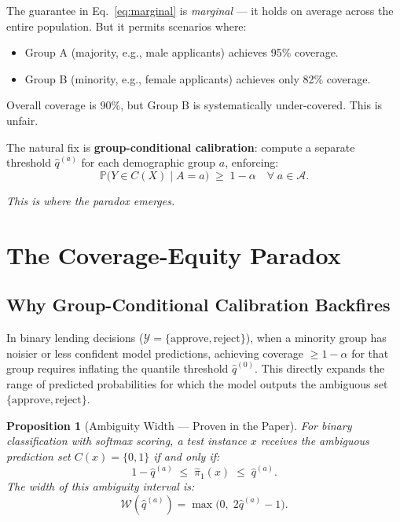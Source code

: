 \documentclass[11pt,a4paper]{article}
\newtheorem{proposition}{Proposition}
\begin{document}
The guarantee in Eq.~\eqref{eq:marginal} is \emph{marginal} --- it holds on average across the entire population. But it permits scenarios where:
\begin{itemize}
    \item Group A (majority, e.g., male applicants) achieves 95\% coverage.
    \item Group B (minority, e.g., female applicants) achieves only 82\% coverage.
\end{itemize}
Overall coverage is 90\%, but Group B is systematically under-covered. This is unfair.

The natural fix is \textbf{group-conditional calibration}: compute a separate threshold $\hat{q}^{(a)}$ for each demographic group $a$, enforcing:
\begin{equation}
\label{eq:group_cond}
\mathbb{P}\bigl(Y \in C(X) \mid A = a\bigr) \;\ge\; 1 - \alpha \quad \forall\; a \in \mathcal{A}.
\end{equation}

\emph{This is where the paradox emerges.}

\section{The Coverage-Equity Paradox}
\label{sec:paradox}

\subsection{Why Group-Conditional Calibration Backfires}

In binary lending decisions ($\mathcal{Y} = \{\text{approve}, \text{reject}\}$), when a minority group has noisier or less confident model predictions, achieving coverage $\ge 1-\alpha$ for that group requires inflating the quantile threshold $\hat{q}^{(0)}$. This directly expands the range of predicted probabilities for which the model outputs the ambiguous set $\{\text{approve}, \text{reject}\}$.

\begin{proposition}[Ambiguity Width --- Proven in the Paper]
For binary classification with softmax scoring, a test instance $x$ receives the ambiguous prediction set $C(x) = \{0,1\}$ if and only if:
\[
1 - \hat{q}^{(a)} \;\le\; \hat{\pi}_1(x) \;\le\; \hat{q}^{(a)}.
\]
The width of this ambiguity interval is:
\[
\mathcal{W}(\hat{q}^{(a)}) = \max\!\bigl(0,\; 2\hat{q}^{(a)} - 1\bigr).
\]
\end{proposition}
\end{document}

